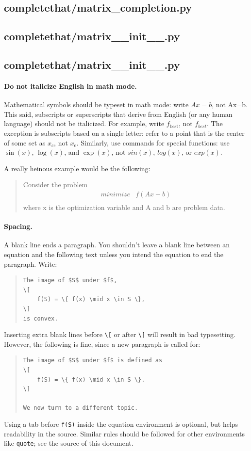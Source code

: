 \documentclass[12pt]{article}
\newcommand{\code}[2] {
  \hrulefill
  \subsection*{#1}
  
  \vspace{2em}
}
\begin{document}
\code{completethat/matrix\_completion.py}{../code/completethat/matrix_completion.py}
\code{completethat/matrix\_\_init\_\_.py}{../code/completethat/__init__.py}
\code{completethat/matrix\_\_init\_\_.py}{../code/setup.py}



\newpage


\paragraph{Do not italicize English in math mode.}
Mathematical symbols should be typeset in math mode:
write $Ax=b$, not Ax=b. This said, subscripts or
superscripts that derive from English (or any human language) should not be
italicized. For example, write $f_\mathrm{best}$, not $f_{best}$. The exception
is subscripts based on a single letter: refer
to a point that is the center of some set as $x_c$, not $x_{\mathrm{c}}$.
Similarly, use commands for special functions: use $\sin(x)$,
$\log(x)$, and $\exp(x)$, not $sin(x)$, $log(x)$, or $exp(x)$.

A really heinous example would be the following:
\begin{quote}
Consider the problem
\[
\begin{array}{ll}
minimize & f(Ax - b) \\
\end{array}
\]
where x is the optimization variable and A and b are problem data.
\end{quote}

\paragraph{Spacing.}
A blank line ends a paragraph. You shouldn't leave a blank line between an
equation and the following text unless you intend the equation to end the
paragraph. Write:
\begin{quote}
\begin{verbatim}
The image of $S$ under $f$,
\[
    f(S) = \{ f(x) \mid x \in S \},
\]
is convex.
\end{verbatim}
\end{quote}
Inserting extra blank lines before \verb+\[+ or after \verb+\]+ will result in
bad typesetting. However, the following is fine, since a new paragraph is called for:
\begin{quote}
\begin{verbatim}
The image of $S$ under $f$ is defined as
\[
    f(S) = \{ f(x) \mid x \in S \}.
\]

We now turn to a different topic.
\end{verbatim}
\end{quote}
Using a tab before \verb+f(S)+ inside the equation environment is
optional, but helps readability in the source.  Similar rules should be
followed for other environments like \texttt{quote}; see the source of this
document.
\end{document}

